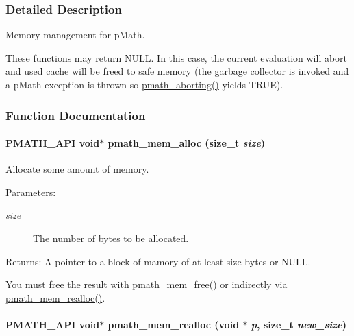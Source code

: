 \subsubsection{Detailed Description}
Memory management for pMath. 

These functions may return NULL. In this case, the current evaluation will abort and used cache will be freed to safe memory (the garbage collector is invoked and a pMath exception is thrown so \hyperlink{group__threads_gb75a9c87401fddb42b297ddb0495415f}{pmath\_\-aborting()} yields TRUE). 

\subsubsection{Function Documentation}
\hypertarget{group__memory_g856c326c830629de5637912fa8bc2bc9}{
\paragraph[{pmath\_\-mem\_\-alloc}]{\setlength{\rightskip}{0pt plus 5cm}PMATH\_\-API void$\ast$ pmath\_\-mem\_\-alloc (size\_\-t {\em size})}\hfill}
\label{group__memory_g856c326c830629de5637912fa8bc2bc9}


Allocate some amount of memory. 

\begin{Desc}
\item[Parameters:]
\begin{description}
\item[{\em size}]The number of bytes to be allocated. \end{description}
\end{Desc}
\begin{Desc}
\item[Returns:]A pointer to a block of mamory of at least size bytes or NULL.\end{Desc}
You must free the result with \hyperlink{group__memory_g936d3001151c35052812e597eb7dce4f}{pmath\_\-mem\_\-free()} or indirectly via \hyperlink{group__memory_g59dc67a7de0dc3111dfb0424df8d8244}{pmath\_\-mem\_\-realloc()}. \hypertarget{group__memory_g59dc67a7de0dc3111dfb0424df8d8244}{
\paragraph[{pmath\_\-mem\_\-realloc}]{\setlength{\rightskip}{0pt plus 5cm}PMATH\_\-API void$\ast$ pmath\_\-mem\_\-realloc (void $\ast$ {\em p}, \/  size\_\-t {\em new\_\-size})}\hfill}
\label{group__memory_g59dc67a7de0dc3111dfb0424df8d8244}


